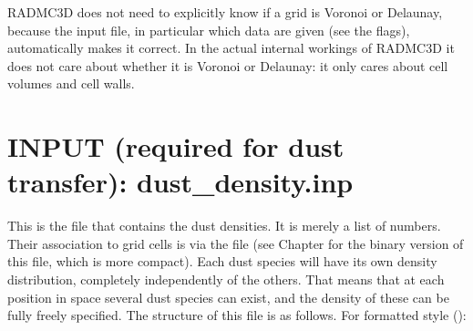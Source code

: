 \documentclass[letterpaper,10pt,english]{sphinxmanual}
\begin{document}
RADMC\sphinxhyphen{}3D does not need to explicitly know if a grid is Voronoi or Delaunay,
because the input file, in particular which data are given (see the
 flags), automatically makes it correct. In the actual internal
workings of RADMC\sphinxhyphen{}3D it does not care about whether it is Voronoi or Delaunay:
it only cares about cell volumes and cell walls.


\section{INPUT (required for dust transfer): dust\_density.inp}
\label{\detokenize{inputoutputfiles:input-required-for-dust-transfer-dust-density-inp}}\label{\detokenize{inputoutputfiles:sec-dustdens}}
This is the file that contains the dust densities. It is merely a list of
numbers. Their association to grid cells is via the file  (see
Chapter {\hyperref[\detokenize{binaryio:chap-binary-io}]{}} for the binary version of this file, which is more
compact).  Each dust species will have its own density distribution, completely
independently of the others. That means that at each position in space several
dust species can exist, and the density of these can be fully freely
specified. The structure of this file is as follows. For formatted style
():

\begin{sphinxVerbatim}[commandchars=\\\{\}]
                                      
\PYG{p}{[}\PYG{p}{]}
\PYG{p}{[}\PYG{p}{]}
\PYG{p}{[}\PYG{p}{]}
\PYG{p}{[}\PYG{p}{]}
\end{sphinxVerbatim}
\end{document}
